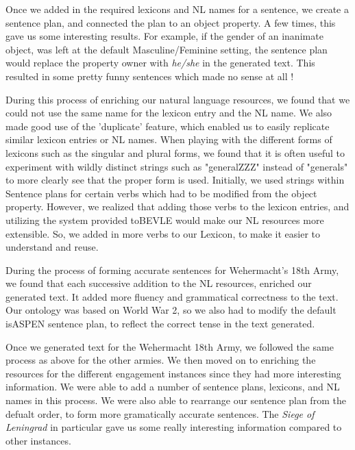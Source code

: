 \documentclass[12pt, letterpaper]{article}
\begin{document}
    \vspace{4mm}

    \noindent
    Once we added in the required lexicons and NL names for a sentence, we create a sentence plan, and connected the plan
    to an object property. A few times, this gave us some interesting results. 
    For example, if the gender of an inanimate object, was left at the default Masculine/Feminine setting,
    the sentence plan would replace the property owner with \textit{he/she} in the generated text. 
    This resulted in some pretty funny sentences which made no sense at all !

    \vspace{4mm}

    \noindent
    During this process of enriching our natural language resources, we found that we could not use the same name for
    the lexicon entry and the NL name. 
    We also made good use of the 'duplicate' feature, which enabled us to easily replicate similar lexicon entries or
    NL names.
    When playing with the different forms of lexicons such as the singular and plural forms, we found that it is often
    useful to experiment with wildly distinct strings such as "generalZZZ" instead of "generals" to more clearly see that
    the proper form is used.
    Initially, we used strings within Sentence plans for certain verbs which had to be modified from the object property.
    However, we realized that adding those verbs to the lexicon entries, and utilizing the system provided toBEVLE
    would make our NL resources more extensible.
    So, we added in more verbs to our Lexicon, to make it easier to understand and reuse.

    \vspace{4mm}

    \noindent
    During the process of forming accurate sentences for Wehermacht's 18th Army, we found that each successive addition
    to the NL resources, enriched our generated text.
    It added more fluency and grammatical correctness to the text.
    Our ontology was based on World War 2, so we also had to modify the default isASPEN sentence plan, to reflect the
    correct tense in the text generated.

    \vspace{4mm}

    \noindent
    Once we generated text for the Wehermacht 18th Army, we followed the same process as above for the other armies.
    We then moved on to enriching the resources for the different engagement instances since they had more interesting
    information.
    We were able to add a number of sentence plans, lexicons, and NL names in this process.
    We were also able to rearrange our sentence plan from the defualt order, to form more gramatically accurate sentences.
    The \textit{Siege of Leningrad} in particular gave us some really interesting information compared to other instances.
\end{document}
